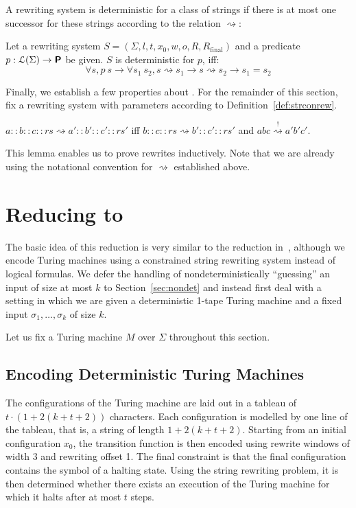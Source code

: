 \documentclass[a4paper,UKenglish,cleveref, autoref]{lipics-v2019}
\newcommand{\strent}{\rightsquigarrow}
\newcommand{\constrent}{\overset{!}{\rightsquigarrow}}
\newcommand{\Rfinal}{R_{\text{final}}}
\begin{document}
A rewriting system is deterministic for a class of strings if there is at most one successor for these strings according to the relation $\strent{}$:
\begin{definition}[Determinism]\label{def:rewdet}
  Let a rewriting system $S = (\Sigma, l, t, x_0, w, o, R, \Rfinal)$ and a predicate $p : \mathcal{L} (\Sigma) \rightarrow \textsf{\bfseries P}$ be given. 
  $S$ is deterministic for $p$, iff: 
  \[ \forall s, p~s \rightarrow \forall s_1~s_2, s \strent{} s_1 \rightarrow s \strent{} s_2 \rightarrow s_1 = s_2 \]
\end{definition}




Finally, we establish a few properties about \strconrew{}. For the remainder of this section, fix a rewriting system with parameters according to Definition~\ref{def:strconrew}.

\begin{lemma}\label{lem:rewind}
  $a :: b :: c :: rs \strent{} a' :: b' :: c' :: rs'$ iff $b :: c :: rs \strent{} b' :: c' :: rs'$ and $abc \constrent{} a'b'c'$. 
\end{lemma}
This lemma enables us to prove rewrites inductively. Note that we are already using the notational convention for $\strent{}$ established above.

\section{Reducing \gennp{} to \strconrew{}}
The basic idea of this reduction is very similar to the reduction in~\cite{Sipser:TheoryofComputation}, although we encode Turing machines using a constrained string rewriting system instead of logical formulas. We defer the handling of nondeterministically ``guessing'' an input of size at most $k$ to Section~\ref{sec:nondet} and instead first deal with a setting in which we are given a deterministic 1-tape Turing machine and a fixed input $\sigma_1, \ldots, \sigma_k$ of size $k$. 

Let us fix a Turing machine $M$ over $\Sigma$ throughout this section. 

\subsection{Encoding Deterministic Turing Machines}
The configurations of the Turing machine are laid out in a tableau of $t \cdot (1 + 2(k + t + 2))$ characters. Each configuration is modelled by one line of the tableau, that is, a string of length $1 + 2(k + t + 2)$. Starting from an initial configuration $x_0$, the transition function is then encoded using rewrite windows of width 3 and rewriting offset 1. The final constraint is that the final configuration contains the symbol of a halting state. 
Using the string rewriting problem, it is then determined whether there exists an execution of the Turing machine for which it halts after at most $t$ steps. 
\end{document}
